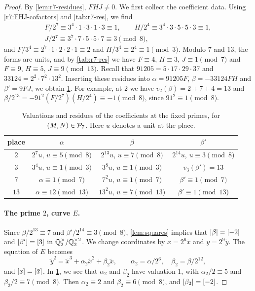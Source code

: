\begin{proof}
By \cref{lem:r7-residues}, $FHJ\ne0$. We first collect the coefficient data.
Using \eqref{r7:FHJ-cofactors} and \cref{tab:r7-res}, we find
\[
\begin{gathered}
 F/2^7\equiv3^4\cdot1\cdot3\cdot1\cdot3\equiv1,\qquad
 H/2^4\equiv3^4\cdot3\cdot5\cdot5\cdot3\equiv1,\\
 J/2^7\equiv3^7\cdot7\cdot5\cdot5\cdot7\equiv3\pmod8,
\end{gathered}
\]
and $F/3^4\equiv2^7\cdot1\cdot2\cdot2\cdot1\equiv2$ and
$H/3^4\equiv2^4\equiv1\pmod3$. Modulo $7$ and $13$, the forms are units, and by
\cref{tab:r7-res} we have $F\equiv4$, $H\equiv3$, $J\equiv1\pmod7$ and
$F\equiv9$, $H\equiv5$, $J\equiv9\pmod{13}$. Recall that
$91205=5\cdot17\cdot29\cdot37$ and $33124=2^2\cdot7^2\cdot13^2$. Inserting
these residues into $\alpha=91205F$, $\beta=-33124FH$ and $\beta'=9FJ$, we
obtain \cref{tab:r7-coef-local}. For example, at $2$ we have
$v_2(\beta)=2+7+4=13$ and
$\beta/2^{13}=-91^2(F/2^7)(H/2^4)\equiv-1\pmod8$, since $91^2\equiv1\pmod8$.

\begin{table}[htbp]
\centering
\caption{Valuations and residues of the coefficients at the fixed primes,
for $(M,N)\in\mathcal P_7$. Here $u$ denotes a unit at the place.}
\label{tab:r7-coef-local}
\begin{tabular}{cccc}
\toprule
place & $\alpha$ & $\beta$ & $\beta'$\\
\midrule
$2$ & $2^7u$, $u\equiv5\pmod 8$ & $2^{13}u$, $u\equiv7\pmod8$ & $2^{14}u$, $u\equiv3\pmod8$\\
$3$ & $3^4u$, $u\equiv1\pmod3$ & $3^8u$, $u\equiv1\pmod3$ & $v_3(\beta')=13$\\
$7$ & $\alpha\equiv1\pmod7$ & $7^2u$, $u\equiv1\pmod7$ & $\beta'\equiv1\pmod7$\\
$13$ & $\alpha\equiv12\pmod{13}$ & $13^2u$, $u\equiv7\pmod{13}$ & $\beta'\equiv1\pmod{13}$\\
\bottomrule
\end{tabular}
\end{table}

\paragraph{The prime $2$, curve $E$.}
Since $\beta/2^{13}\equiv7$ and $\beta'/2^{14}\equiv3\pmod8$,
\cref{lem:squares} implies that $[\beta]=[-2]$ and $[\beta']=[3]$ in
$\mathbb Q_2^{\times}/\mathbb Q_2^{\times2}$. We change coordinates by $x=2^6\tilde x$ and $y=2^9\tilde y$. The equation
of $E$ becomes
\[
 \tilde y^2=\tilde x^3+\alpha_2\tilde x^2+\beta_2\tilde x,\qquad \alpha_2=\alpha/2^6,\quad
 \beta_2=\beta/2^{12},
\]
and $[x]=[\tilde x]$. In \cref{tab:r7-coef-local}, we see that $\alpha_2$ and
$\beta_2$ have valuation $1$, with $\alpha_2/2\equiv5$ and
$\beta_2/2\equiv7\pmod8$. Then $\alpha_2\equiv2$ and $\beta_2\equiv6\pmod8$, and $[\beta_2]=[-2]$.


\end{proof}
